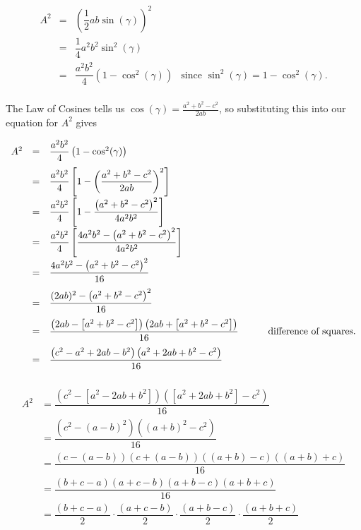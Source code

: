 \[ \begin{array}{rclr} 

A^2 & = & \left(\dfrac{1}{2} ab \sin(\gamma)\right)^2 &\\[10pt] 
    & =  &  \dfrac{1}{4} a^2 b^2 \sin^{2}(\gamma) & \\[10pt]
    & = & \dfrac{a^2b^2}{4} \left(1 - \cos^{2}(\gamma)\right) & \text{since $\sin^2(\gamma) = 1 - \cos^{2}(\gamma)$.} \\ \end{array}\]

The Law of Cosines tells us $\cos(\gamma) = \frac{a^2 + b^2 - c^2}{2ab}$, so substituting this into our equation for $A^2$ gives

\[ \begin{array}{rclr}

A^2 & = &  \dfrac{a^2b^2}{4} \left(1 - \cos^{2}(\gamma)\right) 	& \text{\hphantom{perfect square trinomials.}}\\[10pt]

    & = & \dfrac{a^2b^2}{4} \left[1 - \left( \dfrac{a^2 + b^2 - c^2}{2ab} \right)^2\right] &  \\ [10pt]
    
	 	& = & \dfrac{a^2b^2}{4} \left[1 - \dfrac{\left(a^2 + b^2 - c^2\right)^2}{4a^2b^2} \right] &  \\ [10pt]
	  
	 	& = & \dfrac{a^2b^2}{4} \left[\dfrac{4a^2 b^2  - \left(a^2 + b^2 - c^2\right)^2}{4a^2b^2} \right] &  \\ [10pt]
	 	
	 	& = & \dfrac{4a^2 b^2  - \left(a^2 + b^2 - c^2\right)^2}{16}  &  \\ [10pt]
	 	
	 	& = & \dfrac{(2ab)^2  - \left(a^2 + b^2 - c^2\right)^2}{16}  &  \\ [10pt]
	 	
	 		& = & \dfrac{\left( 2ab - \left[a^2+b^2 - c^2\right]\right)  \left( 2ab + \left[a^2+b^2 - c^2\right]\right)}{16}  & \text{difference of squares.} \\ [10pt]
	 	 	& = & \dfrac{\left(c^2 - a^2 + 2ab - b^2 \right)\left( a^2 + 2ab + b^2- c^2\right)}{16}  &  \\ [10pt]
	 	\end{array} \]
	 	
\begin{align*}
A^2	& =  \dfrac{\left(c^2 - \left[a^2 - 2ab + b^2\right] \right)  \left( \left[a^2 + 2ab + b^2\right]- c^2\right)}{16}    \\ 
    & =  \dfrac{\left(c^2 - (a-b)^2 \right)  \left( (a+b)^2- c^2\right)}{16}    \tag*{perfect square trinomials.}\\ 
    & =  \dfrac{ (c-(a-b))(c+(a-b))((a+b) -c)((a+b)+c)}{16}    \tag*{difference of squares.} \\
 	& =  \dfrac{ (b+c-a)(a+c-b)(a+b-c)(a+b+c)}{16}    \\ 	
    & =  \dfrac{(b+c-a)}{2} \cdot \dfrac{(a+c-b)}{2} \cdot \dfrac{(a+b-c)}{2} \cdot \dfrac{(a+b+c)}{2} 	 		
\end{align*}

